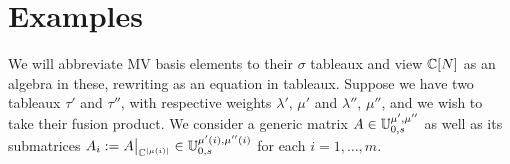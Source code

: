 \documentclass[draft]{article} %
\begin{document}




\section{Examples}
\label{s:examples}

We will abbreviate MV basis elements to their $\sigma$ tableaux and view $\mathbb C[N]$ as an algebra in these, rewriting  as an equation in tableaux. 
Suppose we have two tableaux $\tau'$ and $\tau''$, with respective weights $\lambda'$, $\mu'$ and $\lambda''$, $\mu''$, and we wish to take their fusion product. We consider a generic matrix $A \in \mathbb U^{\mu',\mu''}_{0,s}$ as well as its submatrices $A_i := A\big|_{\mathbb C^{|\mu(i)|}} \in \mathbb U^{\mu'(i), \mu''(i)}_{0,s}$ for each $i=1, \dots, m$.
\end{document}
